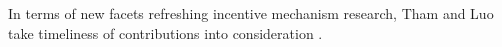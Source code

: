 \documentclass[10pt,conference,compsocconf,letterpaper]{IEEEtran}
\begin{document}
In terms of new facets refreshing incentive mechanism research, Tham and Luo take timeliness of contributions into consideration \cite{Tham2013Quality}. %
\end{document}
